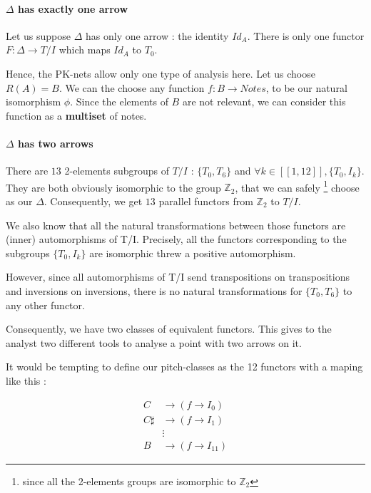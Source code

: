 \documentclass{report}
\begin{document}
\paragraph{$\Delta$ has exactly one arrow}
Let us suppose $\Delta$ has only one arrow : the identity $Id_A$. There is only one functor $F:\Delta \rightarrow T/I$ which maps $Id_A$ to $T_0$.

Hence, the PK-nets allow only one type of analysis here. Let us choose $R(A) = B$. We can the choose any function $f : B \rightarrow Notes$, to be our natural isomorphism $\phi$. Since the elements of $B$ are not relevant, we can consider this function as a \textbf{multiset} of notes.

\paragraph{$\Delta$ has two arrows}
There are $13$ 2-elements subgroups of $T/I$ : $\{T_0,T_6\}$ and $\forall k\in[\![1,12]\!], \{T_0,I_k\}$. They are both obviously isomorphic to the group $\mathbb{Z}_2$, that we can safely \footnote{ since all the 2-elements groups are isomorphic to $\mathbb{Z}_2$} choose as our $\Delta$. Consequently, we get $13$ parallel functors from $\mathbb{Z}_2$ to $T/I$.

We also know that all the natural transformations between those functors are (inner) automorphisms of T/I. Precisely, all the functors corresponding to the subgroups $\{T_0,I_k\}$ are isomorphic threw a positive automorphism.

However, since all automorphisms of T/I send transpositions on transpositions and inversions on inversions, there is no natural transformations for $\{T_0,T_6\}$ to any other functor.

Consequently, we have two classes of equivalent functors. This gives to the analyst two different tools to analyse a point with two arrows on it.

It would be tempting to define our pitch-classes as the 12 functors with a maping like this :


\begin{eqnarray*}
    C & \rightarrow (f \rightarrow I_0) \\
    C\sharp &\rightarrow (f \rightarrow I_1) \\
    &\vdots \\
    B & \rightarrow (f \rightarrow I_{11})
\end{eqnarray*}
\end{document}
